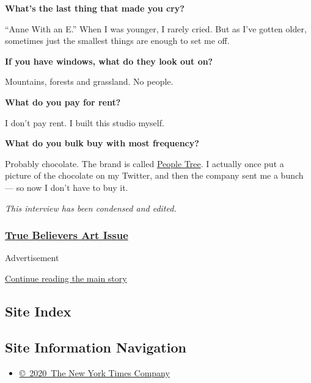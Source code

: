 \textbf{What's the last thing that made you cry?}

``Anne With an E.'' When I was younger, I rarely cried. But as I've
gotten older, sometimes just the smallest things are enough to set me
off.

\textbf{If you have windows, what do they look out on?}

Mountains, forests and grassland. No people.

\textbf{What do you pay for rent?}

I don't pay rent. I built this studio myself.

\textbf{What do you bulk buy with most frequency?}

Probably chocolate. The brand is called
\href{https://www.peopletree.co.jp/choco/index.html}{People Tree}. I
actually once put a picture of the chocolate on my Twitter, and then the
company sent me a bunch --- so now I don't have to buy it.

\emph{This interview has been condensed and edited.}

\hypertarget{true-believers-art-issue}{%
\subsubsection{\texorpdfstring{\href{https://www.nytimes.com/issue/t-magazine/2020/07/02/true-believers-art-issue}{True
Believers Art
Issue}}{True Believers Art Issue}}\label{true-believers-art-issue}}

Advertisement

\protect\hyperlink{after-bottom}{Continue reading the main story}

\hypertarget{site-index}{%
\subsection{Site Index}\label{site-index}}

\hypertarget{site-information-navigation}{%
\subsection{Site Information
Navigation}\label{site-information-navigation}}

\begin{itemize}
\tightlist
\item
  \href{https://help.nytimes.com/hc/en-us/articles/115014792127-Copyright-notice}{©~2020~The
  New York Times Company}
\end{itemize}


